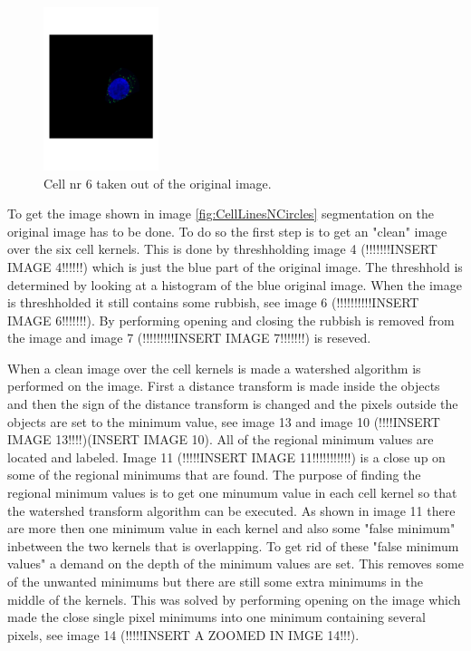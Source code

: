 \documentclass[10pt,twocolumn]{article}
\begin{document}
\begin{figure}[ht]
\centering
\includegraphics[width=0.3\textwidth]{Bilder/CellPart.pdf}
\caption{Cell nr 6 taken out of the original image.}
\label{fig:CellPart}
\end{figure}


To get the image shown in image \ref{fig:CellLinesNCircles} segmentation
on the original image has to be done. To do so the first step is to get an "clean" image over the
six cell kernels. This is done by threshholding image 4 (!!!!!!!INSERT IMAGE 4!!!!!!) which is
just the blue part of the original image. The threshhold is determined by looking at
a histogram of the blue original image. When the image is threshholded it still
contains some rubbish, see image 6 (!!!!!!!!!!INSERT IMAGE 6!!!!!!!).
By performing opening and closing the rubbish is removed from the image and image 7
	(!!!!!!!!!INSERT IMAGE 7!!!!!!!) is reseved.

When a clean image over the cell kernels is made a watershed algorithm is performed
on the image. First a distance transform is made inside the objects and then the sign
of the distance transform is changed and the pixels outside the objects are set
to the minimum value, see image 13 and image 10
(!!!!INSERT IMAGE 13!!!!)(INSERT IMAGE 10). All of the regional minimum values
are located and labeled. Image 11 (!!!!!INSERT IMAGE 11!!!!!!!!!!!) is a close up
on some of the regional minimums that are found. The purpose of finding the
regional minimum values is to get one minumum value in each cell kernel so that
the watershed transform algorithm can be executed. As shown in image 11 there are
more then one minimum value in each kernel and also some "false minimum" inbetween
the two kernels that is overlapping. To get rid of these "false minimum values" a
demand on the depth of the minimum values are set. This removes some of the unwanted
minimums but there are still some extra minimums in the middle of the kernels. This
was solved by performing opening on the image which made the close single pixel
minimums into one minimum containing several pixels, see image 14 (!!!!!INSERT A ZOOMED IN IMGE 14!!!).
\end{document}
